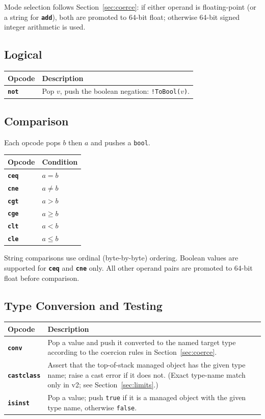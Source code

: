 \documentclass[11pt,a4paper]{article}
\newcommand{\opcode}[1]{\textbf{\texttt{#1}}}
\begin{document}
Mode selection follows Section~\ref{sec:coerce}: if either operand is
floating-point (or a string for \opcode{add}), both are promoted to 64-bit
float; otherwise 64-bit signed integer arithmetic is used.

\subsection{Logical}

\begin{longtable}{lp{10.5cm}}
  \toprule
  \textbf{Opcode} & \textbf{Description} \\
  \midrule
  \endhead
  \opcode{not} & Pop $v$, push the boolean negation: \texttt{!ToBool($v$)}. \\
  \bottomrule
\end{longtable}

\subsection{Comparison}

Each opcode pops $b$ then $a$ and pushes a \texttt{bool}.

\begin{longtable}{ll}
  \toprule
  \textbf{Opcode} & \textbf{Condition} \\
  \midrule
  \endhead
  \opcode{ceq} & $a = b$ \\
  \opcode{cne} & $a \neq b$ \\
  \opcode{cgt} & $a > b$ \\
  \opcode{cge} & $a \geq b$ \\
  \opcode{clt} & $a < b$ \\
  \opcode{cle} & $a \leq b$ \\
  \bottomrule
\end{longtable}

String comparisons use ordinal (byte-by-byte) ordering.
Boolean values are supported for \opcode{ceq} and \opcode{cne} only.
All other operand pairs are promoted to 64-bit float before comparison.

\subsection{Type Conversion and Testing}

\begin{longtable}{lp{10.5cm}}
  \toprule
  \textbf{Opcode}    & \textbf{Description} \\
  \midrule
  \endhead
  \opcode{conv}      &
    Pop a value and push it converted to the named target type according
    to the coercion rules in Section~\ref{sec:coerce}. \\
  \opcode{castclass} &
    Assert that the top-of-stack managed object has the given type name;
    raise a cast error if it does not.
    (Exact type-name match only in v2; see Section~\ref{sec:limits}.) \\
  \opcode{isinst}    &
    Pop a value; push \texttt{true} if it is a managed object with the
    given type name, otherwise \texttt{false}. \\
  \bottomrule
\end{longtable}
\end{document}
